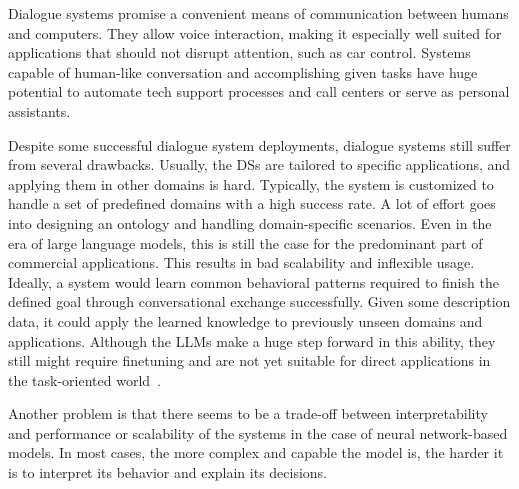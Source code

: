 Dialogue systems promise a convenient means of communication between humans and computers.
They allow voice interaction, making it especially well suited for applications that should not disrupt attention, such as car control.
Systems capable of human-like conversation and accomplishing given tasks have huge potential to automate tech support processes and call centers or serve as personal assistants.

Despite some successful dialogue system deployments, dialogue systems still suffer from several drawbacks.
Usually, the DSs are tailored to specific applications, and applying them in other domains is hard.
Typically, the system is customized to handle a set of predefined domains with a high success rate.
A lot of effort goes into designing an ontology and handling domain-specific scenarios.
Even in the era of large language models, this is still the case for the predominant part of commercial applications.
This results in bad scalability and inflexible usage.
Ideally, a system would learn common behavioral patterns required to finish the defined goal through conversational exchange successfully.
Given some description data, it could apply the learned knowledge to previously unseen domains and applications.
Although the LLMs make a huge step forward in this ability, they still might require finetuning and are not yet suitable for direct applications in the task-oriented world~\cite{iizuka2023clarifying,hudecek-dusek-2023-large}.

Another problem is that there seems to be a trade-off between interpretability and performance or scalability of the systems in the case of neural network-based models.
In most cases, the more complex and capable the model is, the harder it is to interpret its behavior and explain its decisions.

